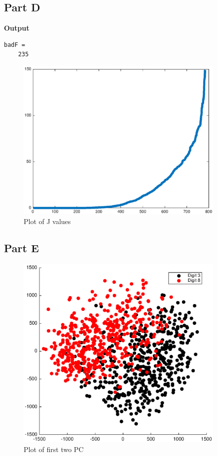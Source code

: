 \documentclass{article}
\begin{document}
\subsection*{Part D}

\textbf{Output}
\begin{lstlisting}
badF =
	235
\end{lstlisting}
\begin{figure}[H]
\centering
\includegraphics[width=4in]{ass2Code/3d.eps}
\caption{Plot of J values}
\end{figure}

\subsection*{Part E}

\begin{figure}[H]
\centering
\includegraphics[width=4in]{ass2Code/3e.eps}
\caption{Plot of first two PC}
\end{figure}
\end{document}
